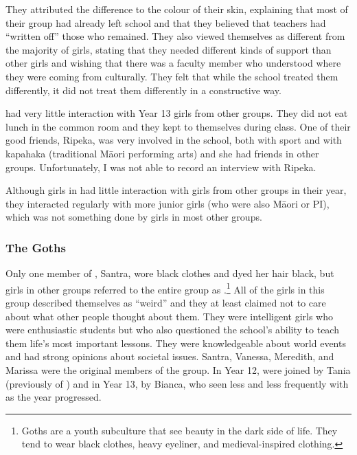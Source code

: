 \vspace{5 mm}

\noindent They attributed the difference to the colour of their skin, explaining that most of their group had already left school and that they believed that teachers had ``written off'' those who remained. They also viewed themselves as different from the majority of girls, stating that they needed different kinds of support than other girls and wishing that there was a faculty member who understood where they were coming from culturally. They felt that while the school treated them differently, it did not treat them differently in a constructive way.



 had very little interaction with Year 13 girls from other groups. They did not eat lunch in the common room and they kept to themselves during class. One of their good friends, Ripeka, was very involved in the school, both with sport and with kapahaka (traditional M\=aori performing arts) and she had friends in other groups. Unfortunately, I was not able to record an interview with Ripeka.

Although girls in  had little interaction with girls from other groups in their year, they interacted regularly with more junior girls (who were also M\=aori or PI), which was not something done by girls in most other groups. 

\subsubsection{The Goths}

Only one member of , Santra, wore black clothes and dyed her hair black, but girls in other groups referred to the entire group as .\footnote{Goths are a youth subculture that see beauty in the dark side of life. They tend to wear black clothes, heavy eyeliner, and medieval-inspired clothing.}  All of the girls in this group described themselves as ``weird'' and they at least claimed not to care about what other people thought about them. They were intelligent girls who were enthusiastic students but who also questioned the school's ability to teach them life's most important lessons. They were knowledgeable about world events and had strong opinions about societal issues. Santra, Vanessa, Meredith, and Marissa were the original members of the group. In Year 12,  were joined by Tania (previously of ) and in Year 13, by Bianca, who seen less and less frequently with  as the year progressed.

